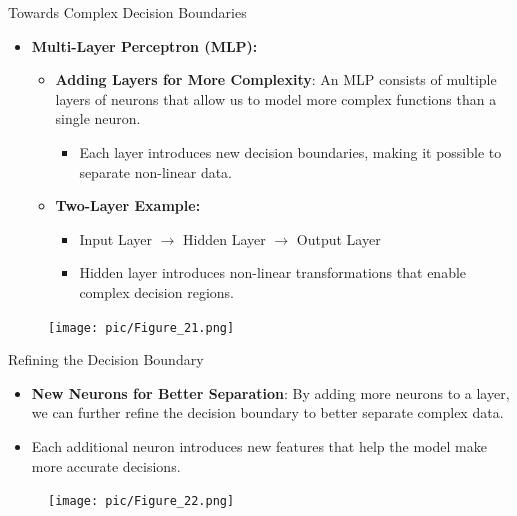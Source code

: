 \documentclass[serif, aspectratio=169]{beamer}
\begin{document}
\begin{frame}{Towards Complex Decision Boundaries}
    \begin{itemize}
        \item \textbf{Multi-Layer Perceptron (MLP):}
        \medskip
        \begin{itemize}\itemsep1em
            \item \justifying \textbf{Adding Layers for More Complexity}:
            An MLP consists of multiple layers of neurons that allow us to model more complex functions than a single neuron.
            \begin{itemize}
                \item \justifying Each layer introduces new decision boundaries, making it possible to separate non-linear data.
            \end{itemize}
            \item \justifying \textbf{Two-Layer Example:}
            \begin{itemize}
                \item Input Layer $\rightarrow$ Hidden Layer $\rightarrow$ Output Layer
                \item Hidden layer introduces non-linear transformations that enable complex decision regions.
            \end{itemize}
        \end{itemize}
    \end{itemize}
    \begin{figure}
        \centering
        \texttt{[image: pic/Figure\_21.png]}
    \end{figure}
    \vfill
\end{frame}


\begin{frame}{Refining the Decision Boundary}
    \begin{itemize}
        \item \justifying \textbf{New Neurons for Better Separation}:
        By adding more neurons to a layer, we can further refine the decision boundary to better separate complex data.
        \item \justifying Each additional neuron introduces new features that help the model make more accurate decisions.
    \end{itemize}
    \begin{figure}
        \centering
        \texttt{[image: pic/Figure\_22.png]}
    \end{figure}
    \vfill
\end{frame}
\end{document}
